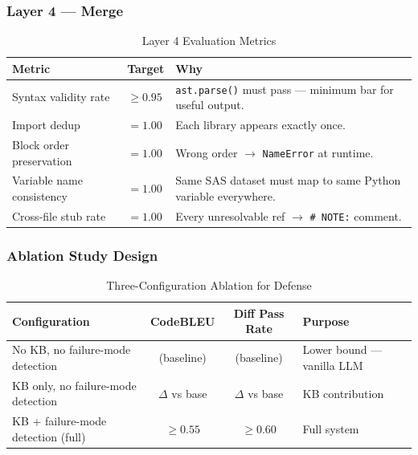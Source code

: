 \documentclass[11pt,a4paper]{article}
\begin{document}
\subsubsection{Layer 4 — Merge}

\begin{table}[H]
\centering
\caption{Layer 4 Evaluation Metrics}
\renewcommand{\arraystretch}{1.25}
\small
\begin{tabularx}{\textwidth}{@{} L{4cm} l X @{}}
\toprule
\textbf{Metric} & \textbf{Target} & \textbf{Why} \\
\midrule
Syntax validity rate & $\geq 0.95$ & \texttt{ast.parse()} must pass — minimum bar for useful output. \\
Import dedup & $= 1.00$ & Each library appears exactly once. \\
Block order preservation & $= 1.00$ & Wrong order $\to$ \texttt{NameError} at runtime. \\
Variable name consistency & $= 1.00$ & Same SAS dataset must map to same Python variable everywhere. \\
Cross-file stub rate & $= 1.00$ & Every unresolvable ref $\to$ \texttt{\# NOTE:} comment. \\
\bottomrule
\end{tabularx}
\end{table}

\subsubsection{Ablation Study Design}

\begin{table}[H]
\centering
\caption{Three-Configuration Ablation for Defense}
\renewcommand{\arraystretch}{1.3}
\begin{tabularx}{\textwidth}{@{} l c c X @{}}
\toprule
\textbf{Configuration} & \textbf{CodeBLEU} & \textbf{Diff Pass Rate} & \textbf{Purpose} \\
\midrule
No KB, no failure-mode detection & (baseline) & (baseline) & Lower bound — vanilla LLM \\
KB only, no failure-mode detection & $\Delta$ vs base & $\Delta$ vs base & KB contribution \\
KB + failure-mode detection (full) & $\geq 0.55$ & $\geq 0.60$ & Full system \\
\bottomrule
\end{tabularx}
\end{table}


\end{document}
